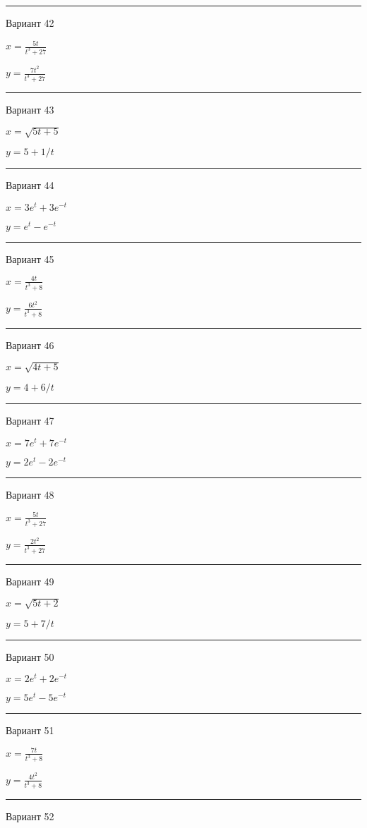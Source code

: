 \documentclass[11pt]{report}
\begin{document}
\rule{\textwidth}{.2mm}

 Вариант 42

$x = \frac{5 t}{t^{3} + 27}$

$y = \frac{7 t^{2}}{t^{3} + 27}$

\rule{\textwidth}{.2mm}

 Вариант 43

$x = \sqrt{5 t + 5}$

$y = 5 + 1 / t$

\rule{\textwidth}{.2mm}

 Вариант 44

$x = 3 e^{t} + 3 e^{- t}$

$y = e^{t} - e^{- t}$

\rule{\textwidth}{.2mm}

 Вариант 45

$x = \frac{4 t}{t^{3} + 8}$

$y = \frac{6 t^{2}}{t^{3} + 8}$

\rule{\textwidth}{.2mm}

 Вариант 46

$x = \sqrt{4 t + 5}$

$y = 4 + 6 / t$

\rule{\textwidth}{.2mm}

 Вариант 47

$x = 7 e^{t} + 7 e^{- t}$

$y = 2 e^{t} - 2 e^{- t}$

\rule{\textwidth}{.2mm}

 Вариант 48

$x = \frac{5 t}{t^{3} + 27}$

$y = \frac{2 t^{2}}{t^{3} + 27}$

\rule{\textwidth}{.2mm}

 Вариант 49

$x = \sqrt{5 t + 2}$

$y = 5 + 7 / t$

\rule{\textwidth}{.2mm}

 Вариант 50

$x = 2 e^{t} + 2 e^{- t}$

$y = 5 e^{t} - 5 e^{- t}$

\rule{\textwidth}{.2mm}

 Вариант 51

$x = \frac{7 t}{t^{3} + 8}$

$y = \frac{4 t^{2}}{t^{3} + 8}$

\rule{\textwidth}{.2mm}

 Вариант 52
\end{document}
